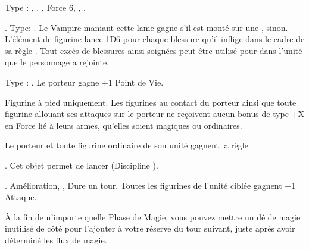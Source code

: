 \startarmymagicalitems

\armymagicalweapons

\startpricelist

 Type : \artilleryweapon{}, \boltthrower{}. , Force 6, , .

 . Type: \hw{}. Le Vampire maniant cette lame gagne  s'il est monté sur une \largetarget{},  sinon. L'élément de figurine lance 1D6 pour chaque blessure qu'il inflige dans le cadre de sa règle \vampiric{}. Tout excès de blessures ainsi soignées peut être utilisé pour \raisewounds{} dans l'unité que le personnage a rejointe.

\endpricelist

\armymagicalarmour

\startpricelist

 Type : \platearmour{}. Le porteur gagne +1 Point de Vie.

\endpricelist

\armytalismans

\startpricelist

 Figurine à pied uniquement. Les figurines au contact du porteur ainsi que toute figurine allouant ses attaques sur le porteur ne reçoivent aucun bonus de type +X en Force lié à leurs armes, qu'elles soient magiques ou ordinaires.

\endpricelist

\armyenchanteditems

\startpricelist

 Le porteur et toute figurine ordinaire de son unité gagnent la règle \distracting{}.

\endpricelist

\armyarcaneitems

\startpricelist

 . Cet objet permet de lancer \necromancyspelltwo{} (Discipline \necromancy{}).

 . Amélioration, , Dure un tour. Toutes les figurines de l'unité ciblée gagnent +1 Attaque.

 À la fin de n'importe quelle Phase de Magie, vous pouvez mettre un dé de magie inutilisé de côté pour l'ajouter à votre réserve du tour suivant, juste après avoir déterminé les flux de magie.

